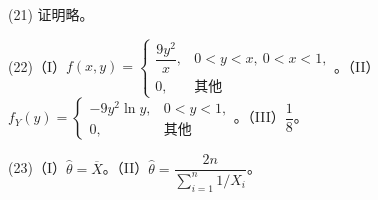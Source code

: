 \documentclass[UTF8,12pt]{ctexart}
\begin{document}
(21) 证明略。


(22)（I）\(\displaystyle f(x,\allowbreak y)=\begin{cases}\dfrac{\displaystyle 9y^2}{\displaystyle x},\allowbreak &0<y<x,\allowbreak \ 0<x<1,\allowbreak \\0,\allowbreak &\text{其他}\end{cases}\)。（II）\(\displaystyle f_Y(y)=\begin{cases}-9y^2\ln y,\allowbreak &0<y<1,\allowbreak \\0,\allowbreak &\text{其他}\end{cases}\)。（III）\(\displaystyle \dfrac{\displaystyle 1}{\displaystyle 8}\)。


(23)（I）\(\displaystyle \hat\theta=\overline X\)。（II）\(\displaystyle \hat\theta=\dfrac{\displaystyle 2n}{\displaystyle \sum_{i=1}^n1/X_i}\)。


\clearpage
\end{document}
